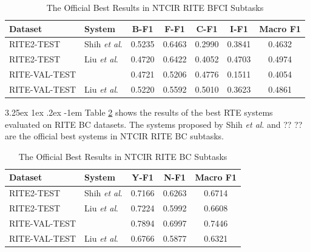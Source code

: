 \documentclass[12pt]{article}
\makeatletter
\renewcommand\paragraph{\@startsection{paragraph}{5}{\z@}%
  {3.25ex \@plus1ex \@minus.2ex}%
  {-1em}%
  {\normalfont\normalsize\bfseries}}
\makeatother
\begin{document}
\begin{CJK*}{UTF8}{bkai}
\begin{spacing}{1.77}
\begin{table}[H]
  \centering
  \setlength{\extrarowheight}{-3pt}
  \begin{tabular}{|l|l|c|c|c|c|c|}
  \hline
   Dataset & System & \multicolumn{1}{c|}{B-F1} & \multicolumn{1}{c|}{F-F1} & \multicolumn{1}{c|}{C-F1} & \multicolumn{1}{c|}{I-F1} & \multicolumn{1}{c|}{Macro F1} \\ \hline
   RITE2-TEST & Shih \emph{et al}. \cite{Shih2013IASLRS} & 0.5235 & 0.6463 & 0.2990 & 0.3841 & 0.4632 \\ \hline
   RITE2-TEST & Liu \emph{et al}. \cite{liu_2016_paper} & 0.4720 & 0.6422 & 0.4052 & 0.4703 & 0.4974 \\ \hline \hline
   RITE-VAL-TEST &  & 0.4721 & 0.5206 & 0.4776 & 0.1511 & 0.4054 \\ \hline
   RITE-VAL-TEST & Liu \emph{et al}. \cite{liu_2016_paper} & 0.5220 & 0.5592 & 0.5010 & 0.3623 & 0.4861 \\ \hline
  \end{tabular}
  \caption{The Official Best Results in NTCIR RITE BFCI Subtasks}
  \label{result:bfci_ntcir}
\end{table}

\paragraph{}
Table \ref{result:bc_ntcir} shows the results of the best RTE systems evaluated on RITE BC datasets. The systems proposed by Shih \emph{et al}. \cite{Shih2013IASLRS} and ?? ?? are the official best systems in NTCIR RITE BC subtasks.

\begin{table}[H]
  \centering
  \setlength{\extrarowheight}{-3pt}
  \begin{tabular}{|l|l|c|c|c|}
  \hline
   Dataset & System & \multicolumn{1}{c|}{Y-F1} & \multicolumn{1}{c|}{N-F1} & \multicolumn{1}{c|}{Macro F1} \\ \hline
  RITE2-TEST & Shih \emph{et al}. \cite{Shih2013IASLRS} & 0.7166 & 0.6263 & 0.6714 \\ \hline
  RITE2-TEST & Liu \emph{et al}. \cite{liu_2016_paper} & 0.7224 & 0.5992 & 0.6608 \\ \hline \hline
  RITE-VAL-TEST & & 0.7894 & 0.6997 & 0.7446 \\ \hline
  RITE-VAL-TEST & Liu \emph{et al}. \cite{liu_2016_paper} & 0.6766 & 0.5877 & 0.6321 \\ \hline
  \end{tabular}
  \caption{The Official Best Results in NTCIR RITE BC Subtasks}
  \label{result:bc_ntcir}
\end{table}


\end{spacing}
\end{CJK*}
\end{document}
